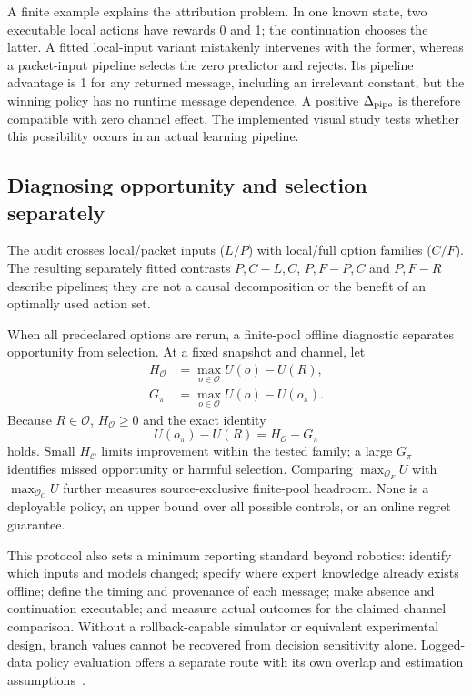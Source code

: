 A finite example explains the attribution problem. In one known state, two executable local actions have rewards 0 and 1; the continuation chooses the latter. A fitted local-input variant mistakenly intervenes with the former, whereas a packet-input pipeline selects the zero predictor and rejects. Its pipeline advantage is 1 for any returned message, including an irrelevant constant, but the winning policy has no runtime message dependence. A positive $\Delta_{\rm pipe}$ is therefore compatible with zero channel effect. The implemented visual study tests whether this possibility occurs in an actual learning pipeline.

\subsection{Diagnosing opportunity and selection separately}
The audit crosses local/packet inputs ($L/P$) with local/full option families ($C/F$). The resulting separately fitted contrasts $P,C-L,C$, $P,F-P,C$ and $P,F-R$ describe pipelines; they are not a causal decomposition or the benefit of an optimally used action set.

When all predeclared options are rerun, a finite-pool offline diagnostic separates opportunity from selection. At a fixed snapshot and channel, let
\begin{align}
 H_{\mathcal O}&=\max_{o\in\mathcal O}U(o)-U(R),\\
 G_\pi&=\max_{o\in\mathcal O}U(o)-U(o_\pi).
\end{align}
Because $R\in\mathcal O$, $H_{\mathcal O}\geq0$ and the exact identity
\begin{equation}\label{eq:regret}
 U(o_\pi)-U(R)=H_{\mathcal O}-G_\pi
\end{equation}
holds. Small $H_{\mathcal O}$ limits improvement within the tested family; a large $G_\pi$ identifies missed opportunity or harmful selection. Comparing $\max_{\mathcal O_F}U$ with $\max_{\mathcal O_C}U$ further measures source-exclusive finite-pool headroom. None is a deployable policy, an upper bound over all possible controls, or an online regret guarantee.

This protocol also sets a minimum reporting standard beyond robotics: identify which inputs and models changed; specify where expert knowledge already exists offline; define the timing and provenance of each message; make absence and continuation executable; and measure actual outcomes for the claimed channel comparison. Without a rollback-capable simulator or equivalent experimental design, branch values cannot be recovered from decision sensitivity alone. Logged-data policy evaluation offers a separate route with its own overlap and estimation assumptions~\cite{dudik,jiang,thomas,swaminathan}.
